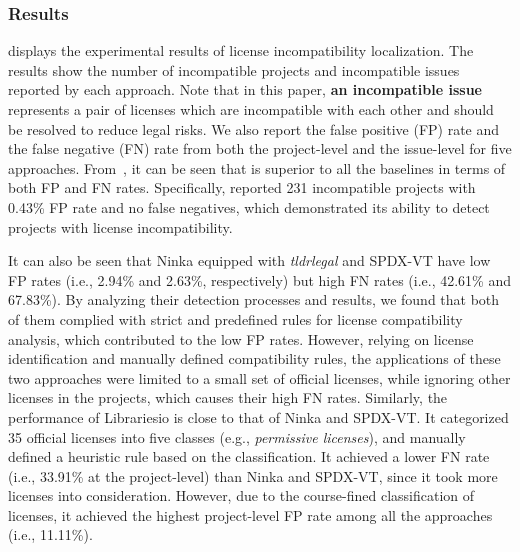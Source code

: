 \fi



\subsubsection{{Results}}



 displays the experimental results of license incompatibility localization. The results show the number of incompatible projects and incompatible issues reported by each approach. Note that in this paper, \textbf{an incompatible issue} represents a pair of licenses which are incompatible with each other and should be resolved to reduce legal risks. We also report the false positive (FP) rate and the false negative (FN) rate from both the project-level and the issue-level for five approaches. 
From~, it can be seen that \tool is superior to all the baselines in terms of both FP and FN rates. Specifically, \tool reported 231 incompatible projects with 0.43\% FP rate  and no false negatives, which demonstrated its ability to detect projects with license incompatibility. 

It can also be seen that Ninka equipped with \textit{tldrlegal} and SPDX-VT have low FP rates (i.e., 2.94\% and 2.63\%, respectively) but high FN rates (i.e., 42.61\% and 67.83\%).
By analyzing their detection processes and results, we found that both of them complied with strict and predefined rules for license compatibility analysis, which contributed to the low FP rates. However, relying on license identification and manually defined compatibility rules, the applications of these two approaches were limited to a small set of official licenses, while ignoring other licenses in the projects, which causes their high FN rates.
Similarly, the performance of Librariesio is close to that of Ninka and SPDX-VT.
It categorized {35} official licenses into five classes (e.g., \textit{permissive licenses}), and manually defined a heuristic rule based on the classification. It achieved a lower FN rate (i.e., 33.91\% at the project-level) than Ninka and SPDX-VT, since it took more licenses into consideration. However, due to the course-fined classification of licenses, it achieved the highest project-level FP rate among all the approaches (i.e., 11.11\%). 


